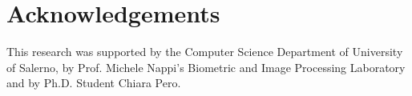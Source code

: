 \section{Acknowledgements}
This research was supported by the Computer Science Department of University of Salerno, by Prof. Michele Nappi's Biometric and Image Processing Laboratory and by Ph.D. Student Chiara Pero.